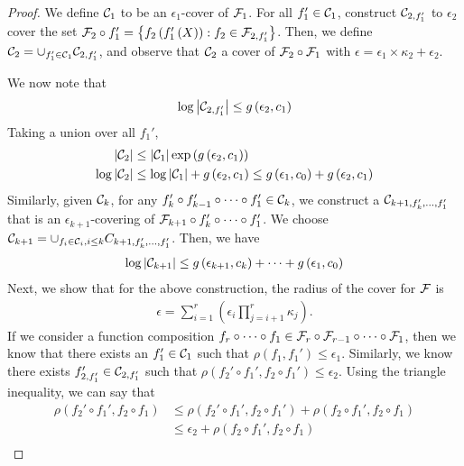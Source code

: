 \begin{proof}
We define $\mathcal C_1$ to be an $\epsilon_1$-cover of $\mathcal F_1$. For all $f_1' \in \mathcal C_1$, construct $\mathcal C_{2, f_1'}$ to $\epsilon_2$ cover the set $\mathcal F_2 \circ f_1' = \left\{f_2\left(f_1'\left(X\right)\right) : f_2 \in \mathcal F_{2,f_1'} \right\}$. Then, we define $\mathcal C_2 = \cup_{f_1'\in \mathcal C_1}\mathcal C_{2,f_1'}$, and observe that $\mathcal C_2$ a cover of $\mathcal F_2 \circ \mathcal F_1$ with $\epsilon = \epsilon_1 \times \kappa_2 + \epsilon_2$.

We now note that
\begin{align}
    \log \left\lvert\mathcal C_{2, f_1'}\right\rvert \leq g\left(\epsilon_2, c_1\right)
\end{align}
Taking a union over all $f_1'$, 
\begin{align}
    \left\lvert\mathcal C_{2}\right\rvert &\leq \left\lvert\mathcal C_{1}\right\rvert \exp\left(g\left(\epsilon_2, c_1\right)\right) \\
    \log\left\lvert\mathcal C_{2}\right\rvert &\leq \log\left\lvert\mathcal C_{1}\right\rvert + g\left(\epsilon_2, c_1\right) \leq g\left(\epsilon_1, c_0\right) + g\left(\epsilon_2, c_1\right)
\end{align}
Similarly, given $\mathcal C_k$, for any $f_k' \circ f_{k-1}' \circ \cdots \circ f_1' \in \mathcal C_k$, we construct a $\mathcal C_{k+1, f_k', \dots, f_1'}$ that is an $\epsilon_{k+1}$-covering of $\mathcal F_{k+1} \circ f_k' \circ \cdots \circ f_1'$. We choose $\mathcal C_{k+1} = \cup_{f_i \in \mathcal C_i, i \leq k} C_{k+1, f_k', \dots, f_1'}$. Then, we have
\begin{align}
    \log \left\lvert\mathcal C_{k+1}\right\rvert \leq g\left(\epsilon_{k+1}, c_k\right) + \cdots + g\left(\epsilon_1, c_0\right)
\end{align}
Next, we show that for the above construction, the radius of the cover for $\mathcal F$ is
\begin{align}
    \epsilon = \sum_{i=1}^{r} \left(\epsilon_i \prod_{j=i+1}^{r}\kappa_{j}\right).
\end{align}
If we consider a function composition $f_r \circ \cdots \circ f_1 \in \mathcal F_r \circ \mathcal F_{r-1} \circ \cdots \circ \mathcal F_1$, then we know that there exists an $f_1' \in \mathcal C_1$ such that $\rho\left(f_1, f_1'\right) \leq \epsilon_1$. Similarly, we know there exists $f_{2, f_1'}' \in \mathcal C_{2, f_1'}$ such that $\rho\left(f_2' \circ f_1', f_2\circ f_1' \right) \leq \epsilon_2$. Using the triangle inequality, we can say that 
\begin{align}
   \rho\left(f_2' \circ f_1', f_2 \circ f_1\right) &\leq \rho\left(f_2' \circ f_1', f_2 \circ f_1'\right) + \rho\left(f_2 \circ f_1', f_2 \circ f_1\right) \\ 
   &\leq \epsilon_2 + \rho\left(f_2 \circ f_1', f_2 \circ f_1\right) \\ 

\end{align}
\end{proof}
